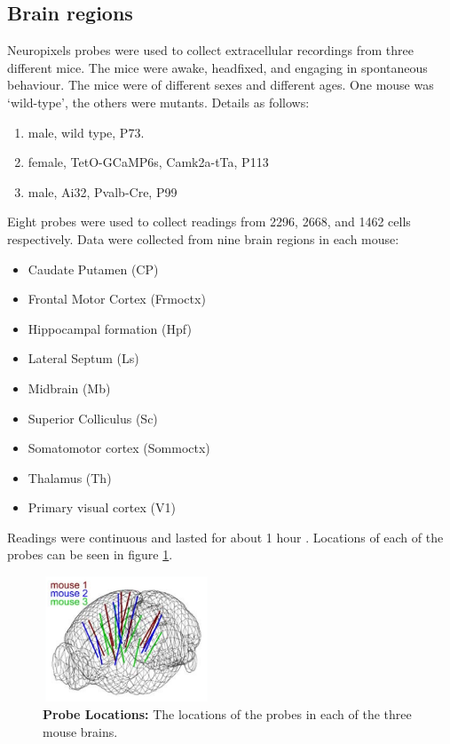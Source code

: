 \documentclass[a4paper,12pt]{article}
\theoremstyle{definition}
\begin{document}
    \subsection{Brain regions}
    Neuropixels probes were used to collect extracellular recordings \cite{jun} from three different mice. The mice were awake, headfixed, and engaging in spontaneous behaviour. The mice were of different sexes and different ages. One mouse was `wild-type', the others were mutants. Details as follows:
    \begin{enumerate}
        \item male, wild type, P73. %
        \item female, TetO-GCaMP6s, Camk2a-tTa, P113 %
        \item male, Ai32, Pvalb-Cre, P99 %
    \end{enumerate}

    Eight probes were used to collect readings from 2296, 2668, and 1462 cells respectively. Data were collected from nine brain regions in each mouse:
    \begin{itemize}
        \item Caudate Putamen (CP)
        \item Frontal Motor Cortex (Frmoctx)
        \item Hippocampal formation (Hpf)
        \item Lateral Septum (Ls)
        \item Midbrain (Mb)
        \item Superior Colliculus (Sc)
        \item Somatomotor cortex (Sommoctx)
        \item Thalamus (Th)
        \item Primary visual cortex (V1)
    \end{itemize}
    Readings were continuous and lasted for about 1 hour \cite{stringer}. Locations of each of the probes can be seen in figure \ref{fig:probe_locations}.

    \begin{figure}[h]
        \centering
        \includegraphics[width=5cm,height=3.75cm]{figures/probe_locations_stringer.png}
        \caption{\textbf{Probe Locations:} The locations of the probes in each of the three mouse brains\cite{stringer}.}
        \label{fig:probe_locations}
    \end{figure}
\end{document}
